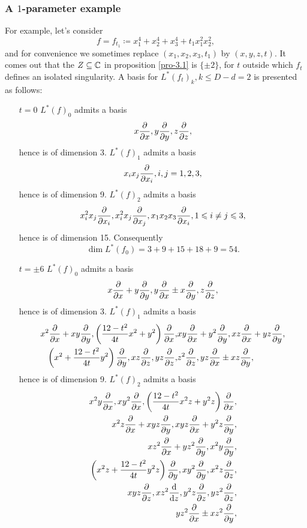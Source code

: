   \subsubsection{A \texorpdfstring{$1$}{1}-parameter example} 
  For example, let's consider
  \[f=f_{t_1}\coloneq x_1^4+x_2^4+x_3^4
  +t_1x_1^2x_2^2,\]
  and for convenience we sometimes replace $(x_1,x_2,x_3,t_1)$ by $(x,y,z,t)$. It comes out that the $Z\subseteq {\mathbb{C}}$ in proposition \ref{pro-3.1} is $\{\pm 2\}$, for $t$ outside which  $f_t$ defines an isolated singularity. A basis for $L^*(f_t)_k, k\leqslant D-d=2$ is presented as follows:
  \begin{itemize}
    \item[$t=0$]
      $L^*(f)_0$ admits a basis 
      \[x\frac{\partial }{\partial x}, y\frac{\partial }{\partial y}, z\frac{\partial }{\partial z},\]
      hence is of dimension 3.
      $L^*(f)_1$ admits a basis 
      \[x_ix_j\frac{\partial }{\partial x_i}, i,j=1,2,3,\]
      hence is of dimension 9.
      $L^*(f)_2$ admits a basis 
      \[x_i^2x_j\frac{\partial }{\partial x_i}, x_i^2x_j\frac{\partial }{\partial x_j}, x_1x_2x_3\frac{\partial }{\partial x_i}, 1\leqslant i \not=j \leqslant 3,\]
      hence is of dimension 15. Consequently
      \[\dim L^*(f_0) = 3+9+15+18+9=54.\]
    \item[$t=\pm 6$]
      $L^*(f)_0$ admits a basis 
      \[ x\frac{\partial }{\partial x}+y\frac{\partial }{\partial y}, y\frac{\partial }{\partial x}\pm x\frac{\partial }{\partial y} , z\frac{\partial }{\partial z},\]
      hence is of dimension 3.
      $L^*(f)_1$ admits a basis 
      \begin{align*}
        x^2\frac{\partial }{\partial x}+xy\frac{\partial }{\partial y},
        \left(\frac{12-t^2}{4t}x^2+y^2\right)\frac{\partial }{\partial x} ,&
        xy\frac{\partial }{\partial x}+y^2\frac{\partial }{\partial y},
        xz\frac{\partial }{\partial x}+yz\frac{\partial }{\partial y},\\
        \left( x^2+\frac{12-t^2}{4t}y^2\right)\frac{\partial }{\partial y}, 
        xz\frac{\partial }{\partial z},
        yz\frac{\partial }{\partial z},&
        z^2\frac{\partial }{\partial z},
        yz\frac{\partial }{\partial x}\pm xz\frac{\partial }{\partial y},
      \end{align*}
      hence is of dimension 9.
      $L^*(f)_2$ admits a basis 
      \begin{align*}
        x^2y\frac{\partial }{\partial x},
        xy^2\frac{\partial }{\partial x},
        \left(\frac{12-t^2}{4t}x^2z+y^2z\right)\frac{\partial }{\partial x},\\
        x^2z\frac{\partial }{\partial x}+xyz\frac{\partial }{\partial y},
        xyz\frac{\partial }{\partial x}+y^2z\frac{\partial }{\partial y},\\
        xz^2\frac{\partial }{\partial x}+yz^2\frac{\partial }{\partial y},
        x^2y\frac{\partial }{\partial y},\\
        \left(x^2z+\frac{12-t^2}{4t}y^2z\right)\frac{\partial }{\partial y},
        xy^2\frac{\partial }{\partial y},
        x^2z\frac{\partial }{\partial z},\\
        xyz\frac{\partial }{\partial z},
        xz^2\frac{\mathrm{d} }{\mathrm{d} z},
        y^2z\frac{\partial }{\partial z},
        yz^2\frac{\partial }{\partial z},\\
        yz^2\frac{\partial }{\partial x}\pm xz^2\frac{\partial }{\partial y},
      \end{align*}

\end{itemize}
